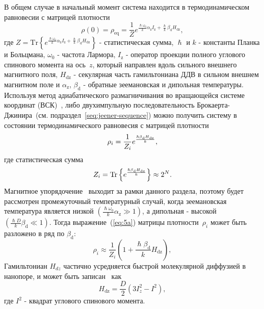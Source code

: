 В общем случае в начальный момент система находится в термодинамическом равновесии с матрицей плотности
%
\begin{equation}\label{eq:4}
    \rho(0) = \rho_\mathrm{eq} = \dfrac{1}{Z}
    e^{
      \frac{\hslash \omega_{0}}{k} \alpha_\mathrm{z} I_\mathrm{z}
      + \frac{\hslash }{k} \beta_\mathrm{d} H_\mathrm{dz}
    },
\end{equation}
%
где
$Z = \mathrm{Tr} \left\{ e^{\frac{\hslash \omega_{0}}{k} \alpha_\mathrm{z} I_\mathrm{z} + \frac{\hslash }{k} \beta_\mathrm{d} H_\mathrm{dz}} \right\}$ - статистическая сумма,
$\hslash$ и $k$ - константы Планка и Больцмана,
$\omega_{0}$ - частота Лармора,
$I_\mathrm{z}$ -  оператор проекции полного углового спинового момента  на ось~$z$,
который направлен вдоль сильного внешнего магнитного поля,
$H_\mathrm{dz}$ - секулярная часть гамильтониана ДДВ в сильном внешнем магнитном поле
и $\alpha_\mathrm{z}$, $\beta_\mathrm{d}$ - обратные зеемановская и дипольная температуры.
%
Используя  метод адиабатического размагничивания во вращающейся системе координат (ВСК)~\cite{Goldman1970, Slichter1961},
либо двухимпульную последовательность Брокаерта-Джинира~(см. подраздел~\ref{seq:jeener-sequence})
можно получить систему в состоянии термодинамического равновесия с матрицей плотности
%
\begin{equation}\label{eq:5a}
  \rho_i = \frac{1}{Z_i} e^\frac{\hslash\beta_\mathrm{d} H_\mathrm{dz}}{k},
\end{equation}
%
где статистическая сумма
%
\begin{equation}\label{eq:6}
  Z_i = \mathrm{Tr} \left\{ e^\frac{\hslash\beta_\mathrm{d} H_\mathrm{dz}}{k} \right\} \approx 2^{N}.
\end{equation}
%
Магнитное упорядочение~\cite{Abragam1982} выходит за рамки данного раздела,
поэтому будет рассмотрен промежуточный температурный случай,
когда зеемановская температура является низкой $({\frac{\hslash \omega_{0}}{k} \alpha_\mathrm{z}}\gg 1)$,
а дипольная - высокой $\left( \frac{\hslash{D}}{k}\beta_\mathrm{d} \ll 1\right)$.
Тогда выражение~(\ref{eq:5a}) матрицы плотности~$\rho_i$ может быть разложено в ряд по $\beta_\mathrm{d}$:
%
\begin{equation}\label{eq:5}
  \rho_i \approx \frac{1}{Z_i}(1 + \frac{\hslash\beta_\mathrm{d}}{k} H_\mathrm{dz}),
\end{equation}
%
Гамильтониан $H_{dz}$ частично усредняется быстрой молекулярной диффузией в нанопоре,
и может быть записан~\cite{Feldman2004,Doronin2011} как
%
\begin{equation}
  \label{eq:7}
  H_\mathrm{dz} = \dfrac{D}{2} (3 I^{2}_{z} - I^{2}) , %
\end{equation}
%
где $I^{2}$ - квадрат углового спинового  момента.

